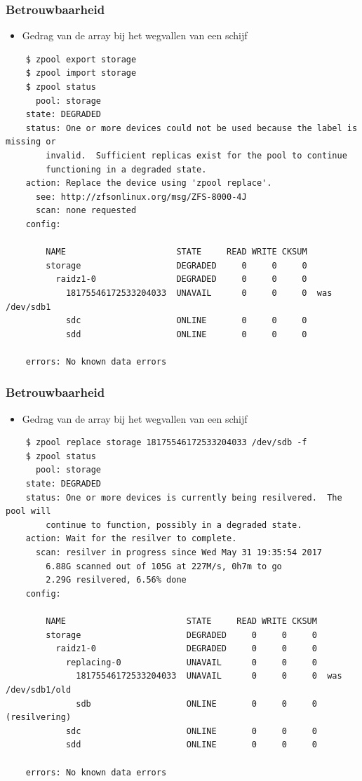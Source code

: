 \documentclass{beamer}
\begin{document}
\begin{frame}[fragile]
  \frametitle{Betrouwbaarheid}
  \begin{itemize}
    \item Gedrag van de array bij het wegvallen van een schijf
  \end{itemize}
  \begin{verbatim}
    $ zpool export storage
    $ zpool import storage
    $ zpool status 
      pool: storage
    state: DEGRADED
    status: One or more devices could not be used because the label is missing or
	    invalid.  Sufficient replicas exist for the pool to continue
	    functioning in a degraded state.
    action: Replace the device using 'zpool replace'.
      see: http://zfsonlinux.org/msg/ZFS-8000-4J
      scan: none requested
    config:

	    NAME                      STATE     READ WRITE CKSUM
	    storage                   DEGRADED     0     0     0
	      raidz1-0                DEGRADED     0     0     0
	        18175546172533204033  UNAVAIL      0     0     0  was /dev/sdb1
	        sdc                   ONLINE       0     0     0
	        sdd                   ONLINE       0     0     0

    errors: No known data errors
  \end{verbatim}
\end{frame}

\begin{frame}[fragile]
  \frametitle{Betrouwbaarheid}
  \begin{itemize}
    \item Gedrag van de array bij het wegvallen van een schijf
  \end{itemize}
  \begin{verbatim}
    $ zpool replace storage 18175546172533204033 /dev/sdb -f
    $ zpool status 
      pool: storage
    state: DEGRADED
    status: One or more devices is currently being resilvered.  The pool will
	    continue to function, possibly in a degraded state.
    action: Wait for the resilver to complete.
      scan: resilver in progress since Wed May 31 19:35:54 2017
        6.88G scanned out of 105G at 227M/s, 0h7m to go
        2.29G resilvered, 6.56% done
    config:

	    NAME                        STATE     READ WRITE CKSUM
	    storage                     DEGRADED     0     0     0
	      raidz1-0                  DEGRADED     0     0     0
	        replacing-0             UNAVAIL      0     0     0
	          18175546172533204033  UNAVAIL      0     0     0  was /dev/sdb1/old
	          sdb                   ONLINE       0     0     0  (resilvering)
	        sdc                     ONLINE       0     0     0
	        sdd                     ONLINE       0     0     0

    errors: No known data errors
  \end{verbatim}
\end{frame}
\end{document}

